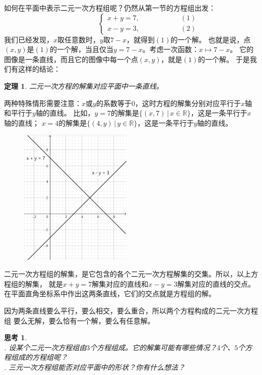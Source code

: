 \documentclass[12pt,UTF8]{ctexbook}
\newtheorem{tm}{定理}[section]
\newtheorem{sk}{思考}[section]
\begin{document}
如何在平面中表示二元一次方程组呢？仍然从第一节的方程组出发：
$$ \quad \quad \quad \quad \quad\left\{
\begin{array}{cr}
     x + y = 7, & \quad \quad \quad \quad \quad (1) \\
     x - y = 3, & \quad \quad \quad \quad \quad (2)
\end{array}\right.
$$
我们已经发现，$x$取任意数时，$y$取$7 - x$，就得到$(1)$的一个解。
也就是说，点$(x, y)$是$(1)$的一个解，当且仅当$y = 7 - x$。考虑一次函数：$x \mapsto 7 - x$。
它的图像是一条直线，而且它的图像中每一个点$(x, y)$，就是$(1)$的一个解。
于是我们有这样的结论：
\begin{tm}
    二元一次方程的解集对应平面中一条直线。
\end{tm}
两种特殊情形需要注意：$x$或$y$的系数等于$0$，这时方程的解集分别对应平行于$x$轴和平行于$y$轴的直线。
比如，$y = 7$的解集是$\{(x, 7) \,|\, x\in\mathbb{R}\}$，这是一条平行于$x$轴的直线；
$x = 4$的解集是$\{(4, y) \,|\, y\in\mathbb{R}\}$，这是一条平行于$y$轴的直线。

\begin{figure} %
    \vspace{-15pt}
    \flushright
    \includegraphics[width=0.48\textwidth]{tu/二元一次方程组.png}
\end{figure}

二元一次方程组的解集，是它包含的各个二元一次方程解集的交集。所以，以上方程组的解集，
就是$x + y = 7$解集对应的直线和$x - y = 3$解集对应的直线的交点。
在平面直角坐标系中作出这两条直线，它们的交点就是方程组的解。

因为两条直线要么平行，要么相交，要么重合，所以两个方程构成的二元一次方程组
要么无解，要么恰有一个解，要么有任意解。

\begin{sk}\label{sk:6-3-0}
    \mbox{}\\
    . 设某个二元一次方程组由$3$个方程组成。它的解集可能有哪些情况？$4$个、$5$个方程组成的方程组呢？\\
    . 三元一次方程组能否对应平面中的形状？你有什么想法？
\end{sk}
\end{document}
